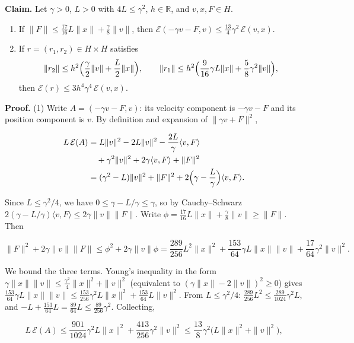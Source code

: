 \documentclass[11pt,a4paper]{article}
\begin{document}
\textbf{Claim.} Let \(\gamma>0\), \(L>0\) with \(4L\le\gamma^2\), \(h\in\mathbb R\), and \(v,x,F\in H\).



\begin{enumerate}


\item If \(\|F\|\le\frac{17}{16}L\|x\|+\frac\gamma8\|v\|\), then \(\mathcal E(-\gamma v-F,v)\le\frac{13}{4}\gamma^2\,\mathcal E(v,x)\).

\item If \(r=(r_1,r_2)\in H\times H\) satisfies
\[\|r_2\|\le h^2\Bigl(\frac\gamma2\|v\|+\frac L2\|x\|\Bigr),\qquad \|r_1\|\le h^2\Bigl(\frac9{16}\gamma L\|x\|+\frac58\gamma^2\|v\|\Bigr),\]
then \(\mathcal E(r)\le3h^4\gamma^4\,\mathcal E(v,x)\).

\end{enumerate}



\textbf{Proof.} (1) Write \(A=(-\gamma v-F,v)\): its velocity component is \(-\gamma v-F\) and its position component is \(v\). By definition and expansion of \(\|\gamma v+F\|^2\),


\[\begin{aligned}
L\,\mathcal E(A)&=L\|v\|^2-2L\|v\|^2-\frac{2L}{\gamma}\langle v,F\rangle\\
&\quad+\gamma^2\|v\|^2+2\gamma\langle v,F\rangle+\|F\|^2\\
&=(\gamma^2-L)\|v\|^2+\|F\|^2
  +2\Bigl(\gamma-\frac L\gamma\Bigr)\langle v,F\rangle.
\end{aligned}\]


Since \(L\le\gamma^2/4\), we have \(0\le\gamma-L/\gamma\le\gamma\), so by Cauchy–Schwarz \(2(\gamma-L/\gamma)\langle v,F\rangle\le2\gamma\|v\|\|F\|\). Write \(\phi=\frac{17}{16}L\|x\|+\frac\gamma8\|v\|\ge\|F\|\). Then


\[\|F\|^2+2\gamma\|v\|\|F\|\le\phi^2+2\gamma\|v\|\phi=\frac{289}{256}L^2\|x\|^2+\frac{153}{64}\gamma L\|x\|\|v\|+\frac{17}{64}\gamma^2\|v\|^2 .\]


We bound the three terms. Young's inequality in the form \(\gamma\|x\|\|v\|\le\frac{\gamma^2}4\|x\|^2+\|v\|^2\) (equivalent to \((\gamma\|x\|-2\|v\|)^2\ge0\)) gives \(\frac{153}{64}\gamma L\|x\|\|v\|\le\frac{153}{256}\gamma^2L\|x\|^2+\frac{153}{64}L\|v\|^2\). From \(L\le\gamma^2/4\): \(\frac{289}{256}L^2\le\frac{289}{1024}\gamma^2L\), and \(-L+\frac{153}{64}L=\frac{89}{64}L\le\frac{89}{256}\gamma^2\). Collecting,


\[L\,\mathcal E(A)\le\frac{901}{1024}\gamma^2L\|x\|^2+\frac{413}{256}\gamma^2\|v\|^2\le\frac{13}{8}\gamma^2\bigl(L\|x\|^2+\|v\|^2\bigr),\]
\end{document}
